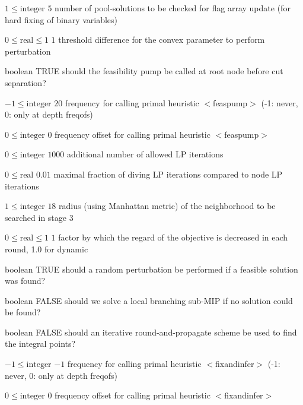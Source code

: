 %
{$1\leq\textrm{integer}$}%
{$5$}%
{number of pool-solutions to be checked for flag array update (for hard fixing of binary variables)}%
{}

%
{$0\leq\textrm{real}\leq1$}%
{$1$}%
{threshold difference for the convex parameter to perform perturbation}%
{}

%
{boolean}%
{TRUE}%
{should the feasibility pump be called at root node before cut separation?}%
{}

%
{$-1\leq\textrm{integer}$}%
{$20$}%
{frequency for calling primal heuristic $<$feaspump$>$ (-1: never, 0: only at depth freqofs)}%
{}

%
{$0\leq\textrm{integer}$}%
{$0$}%
{frequency offset for calling primal heuristic $<$feaspump$>$}%
{}

%
{$0\leq\textrm{integer}$}%
{$1000$}%
{additional number of allowed LP iterations}%
{}

%
{$0\leq\textrm{real}$}%
{$0.01$}%
{maximal fraction of diving LP iterations compared to node LP iterations}%
{}

%
{$1\leq\textrm{integer}$}%
{$18$}%
{radius (using Manhattan metric) of the neighborhood to be searched in stage 3}%
{}

%
{$0\leq\textrm{real}\leq1$}%
{$1$}%
{factor by which the regard of the objective is decreased in each round, 1.0 for dynamic}%
{}

%
{boolean}%
{TRUE}%
{should a random perturbation be performed if a feasible solution was found?}%
{}

%
{boolean}%
{FALSE}%
{should we solve a local branching sub-MIP if no solution could be found?}%
{}

%
{boolean}%
{FALSE}%
{should an iterative round-and-propagate scheme be used to find the integral points?}%
{}

%
{$-1\leq\textrm{integer}$}%
{$-1$}%
{frequency for calling primal heuristic $<$fixandinfer$>$ (-1: never, 0: only at depth freqofs)}%
{}

%
{$0\leq\textrm{integer}$}%
{$0$}%
{frequency offset for calling primal heuristic $<$fixandinfer$>$}%
{}


